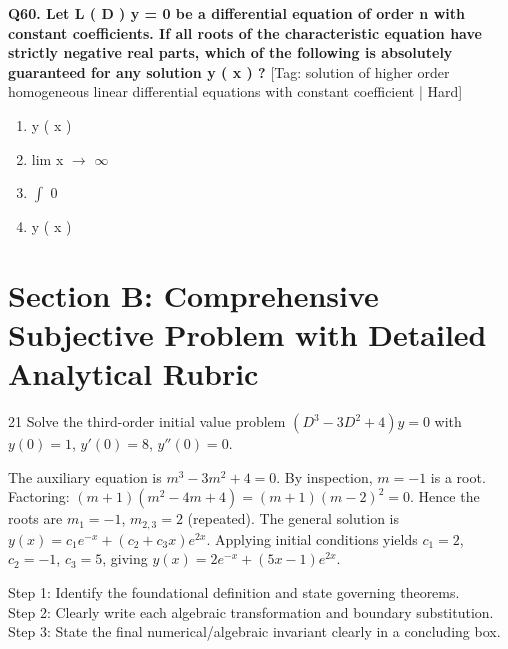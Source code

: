 \noindent\textbf{Q60. Let L ( D ) y = 0 be a differential equation of order n with constant coefficients. If all roots of the characteristic equation have strictly negative real parts, which of the following is absolutely guaranteed for any solution y ( x ) ?} \hfill [Tag: solution of higher order homogeneous linear differential equations with constant coefficient | Hard]
\begin{enumerate}[label=(\alph*),topsep=2pt,itemsep=1pt,partopsep=0pt,parsep=0pt]
    \item {{y ( x )}}
    \item {{lim x $\to$ $\infty$}}
    \item {{$\int$ 0}}
    \item {{y ( x )}}
\end{enumerate}
\vspace{2mm}


\section{Section B: Comprehensive Subjective Problem with Detailed Analytical Rubric}

\begin{subjectiveq}{2}{1}
Solve the third-order initial value problem $(D^3 - 3D^2 + 4)y = 0$ with $y(0) = 1$, $y'(0) = 8$, $y''(0) = 0$.
\end{subjectiveq}

\begin{solbox}
The auxiliary equation is $m^3 - 3m^2 + 4 = 0$. By inspection, $m = -1$ is a root. Factoring: $(m + 1)(m^2 - 4m + 4) = (m + 1)(m - 2)^2 = 0$. Hence the roots are $m_1 = -1$, $m_{2,3} = 2$ (repeated). The general solution is $y(x) = c_1 e^{-x} + (c_2 + c_3 x)e^{2x}$. Applying initial conditions yields $c_1 = 2$, $c_2 = -1$, $c_3 = 5$, giving $y(x) = 2e^{-x} + (5x - 1)e^{2x}$.
\end{solbox}

\begin{examinertip}
Step 1: Identify the foundational definition and state governing theorems.\\
Step 2: Clearly write each algebraic transformation and boundary substitution.\\
Step 3: State the final numerical/algebraic invariant clearly in a concluding box.
\end{examinertip}
